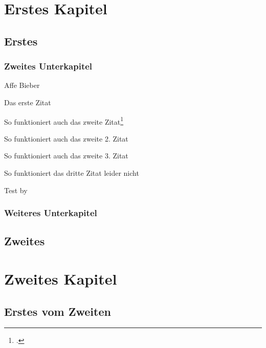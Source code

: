 \chapter{Erstes Kapitel}                %
\section{Erstes}                        %
\subsection{Zweites Unterkapitel}       %

Affe
Bieber

Das erste Zitat\par
So funktioniert auch das zweite Zitat\footcite{aristotle:physics}\par
So funktioniert auch das zweite 2. Zitat \cite{aristotle:physics}\par
So funktioniert auch das zweite 3. Zitat \autocite[80]{aristotle:physics}\par 
So funktioniert das dritte Zitat leider nicht \autocite{aristotle:physics}\par
Test \citeyear{aristotle:physics} by \citeauthor{aristotle:physics}

\subsection{Weiteres Unterkapitel}       %
\section{Zweites}
\newpage
\chapter{Zweites Kapitel}
\section{Erstes vom Zweiten}